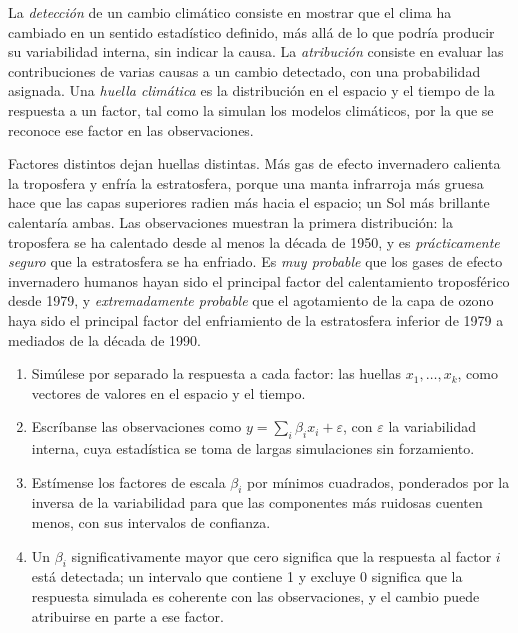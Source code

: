 \begin{definition}\label{def:b2:anthropogenic-climate-change:da}
La \emph{detección} de un cambio climático consiste en mostrar que el
clima ha cambiado en un sentido estadístico definido, más allá de lo que podría producir su variabilidad interna,
sin indicar la causa. La \emph{atribución} consiste en evaluar las
contribuciones de varias causas a un cambio detectado, con una probabilidad asignada. Una \emph{huella
climática} es la distribución en el espacio y el tiempo de la respuesta a un
factor, tal como la simulan los modelos climáticos, por la que se reconoce ese factor en las observaciones.
\end{definition}

Factores distintos dejan huellas distintas. Más gas de efecto invernadero calienta la troposfera y enfría
la estratosfera, porque una manta infrarroja más gruesa hace que las capas superiores radien más hacia el espacio;
un Sol más brillante calentaría ambas. Las observaciones muestran la primera distribución: la troposfera se ha calentado
desde al menos la década de 1950, y es \emph{prácticamente seguro} que la estratosfera se ha enfriado. Es
\emph{muy probable} que los gases de efecto invernadero humanos hayan sido el principal factor del calentamiento troposférico
desde 1979, y \emph{extremadamente probable} que el agotamiento de la capa de ozono haya sido el principal factor del
enfriamiento de la estratosfera inferior de 1979 a mediados de la década de 1990.

\begin{method}\label{met:b2:anthropogenic-climate-change:fingerprinting}
\begin{enumerate}
  \item Simúlese por separado la respuesta a cada factor: las huellas $x_1, \dots, x_k$, como
        vectores de valores en el espacio y el tiempo.
  \item Escríbanse las observaciones como $y = \sum_i \beta_i x_i + \varepsilon$, con $\varepsilon$ la
        variabilidad interna, cuya estadística se toma de largas simulaciones sin forzamiento.
  \item Estímense los factores de escala $\beta_i$ por mínimos cuadrados, ponderados por la inversa de la
        variabilidad para que las componentes más ruidosas cuenten menos, con sus intervalos de confianza.
  \item Un $\beta_i$ significativamente mayor que cero significa que la respuesta al factor $i$ está
        detectada; un intervalo que contiene 1 y excluye 0 significa que la respuesta simulada es
        coherente con las observaciones, y el cambio puede atribuirse en parte a ese factor.
\end{enumerate}
\end{method}

